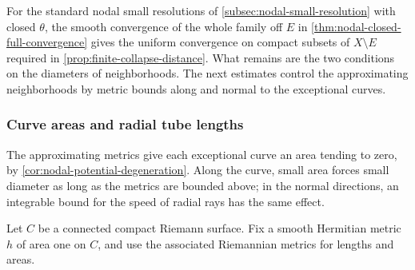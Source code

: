 For the standard nodal small resolutions of \cref{subsec:nodal-small-resolution} with closed $\theta$, the smooth convergence of the whole family off $E$ in \cref{thm:nodal-closed-full-convergence} gives the uniform convergence on compact subsets of $X\setminus E$ required in \cref{prop:finite-collapse-distance}. What remains are the two conditions on the diameters of neighborhoods. The next estimates control the approximating neighborhoods by metric bounds along and normal to the exceptional curves.

\subsubsection{Curve areas and radial tube lengths}
\label{subsec:curve-tube-diameters}

The approximating metrics give each exceptional curve an area tending to zero, by \cref{cor:nodal-potential-degeneration}. Along the curve, small area forces small diameter as long as the metrics are bounded above; in the normal directions, an integrable bound for the speed of radial rays has the same effect.

Let $C$ be a connected compact Riemann surface. Fix a smooth Hermitian metric $h$ of area one on $C$, and use the associated Riemannian metrics for lengths and areas.

